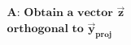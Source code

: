 \documentclass[preview]{standalone}
\begin{document}
\begin{align*}
\textbf{A: Obtain a vector} \,\, \mathbf{\vec{z}} \\ \textbf{orthogonal to} \,\, \mathbf{\vec{y}}_{\textbf{proj}}
\end{align*}
\end{document}
